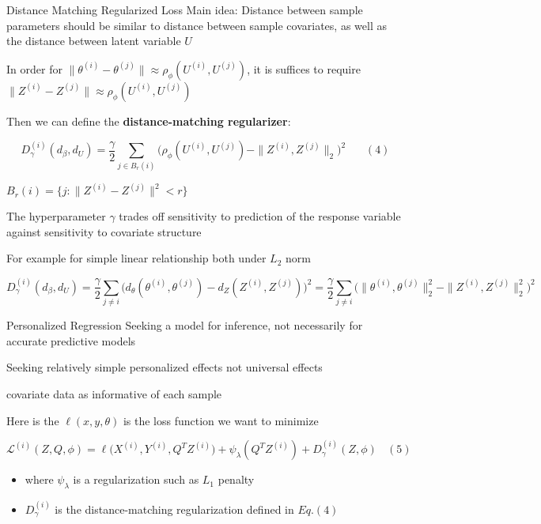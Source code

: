 \documentclass[
  10pt,
  ignorenonframetext,
]{beamer}
\begin{document}
\begin{frame}{Distance Matching Regularized Loss}
\protect\hypertarget{distance-matching-regularized-loss}{}
Main idea: Distance between sample parameters should be similar to
distance between sample covariates, as well as the distance between
latent variable \(U\)

In order for
\(\|\theta^{(i)} - \theta^{(j)}\| \approx \rho_{\phi}(U^{(i)}, U^{(j)})\),
it is suffices to require
\(\|Z^{(i)} - Z^{(j)}\| \approx \rho_{\phi}(U^{(i)}, U^{(j)})\)

Then we can define the \textbf{distance-matching regularizer}:

\[
D^{(i)}_{\gamma} (d_{\beta}, d_U) = \frac {\gamma} {2} \sum_{j \in B_r(i)} \bigg( \rho_\phi (U^{(i)}, U^{(j)}) - \|Z^{(i)}, Z^{(j)}\|_2\bigg)^2 \ \ \ \ \ \ \ \ (4)
\]

\tiny

\(B_r(i) = \{j : \|Z^{(i)} - Z^{(j)}\|^2 < r\}\)

The hyperparameter \(\gamma\) trades off sensitivity to prediction of
the response variable against sensitivity to covariate structure

For example for simple linear relationship both under \(L_2\) norm

\[
D^{(i)}_{\gamma} (d_{\beta}, d_U) = \frac {\gamma} {2} \sum_{j \neq i} \bigg( d_\theta (\theta^{(i)}, \theta^{(j)}) - d_Z(Z^{(i)}, Z^{(j)})\bigg)^2 = \frac {\gamma} {2} \sum_{j \neq i} \bigg( \|\theta^{(i)}, \theta^{(j)}\|_2^2 - \|Z^{(i)}, Z^{(j)}\|_2^2 \bigg)^2
\]
\end{frame}

\begin{frame}{Personalized Regression}
\protect\hypertarget{personalized-regression}{}
Seeking a model for inference, not necessarily for accurate predictive
models

Seeking relatively simple personalized effects not universal effects

covariate data as informative of each sample

Here is the \(\ell (x, y, \theta)\) is the loss function we want to
minimize

\[
\mathcal L^{(i)} (Z, Q, \phi) =  \ell \big(X^{(i)}, Y^{(i)}, Q^TZ^{(i)}\big) + \psi_\lambda(Q^TZ^{(i)}) + D_\gamma^{(i)}(Z, \phi) \ \ \ \  (5)
\]

\tiny

\begin{itemize}
\item
  where \(\psi_\lambda\) is a regularization such as \(L_1\) penalty
\item
  \(D_\gamma^{(i)}\) is the distance-matching regularization defined in
  \(Eq.(4)\)
\end{itemize}
\end{frame}
\end{document}
